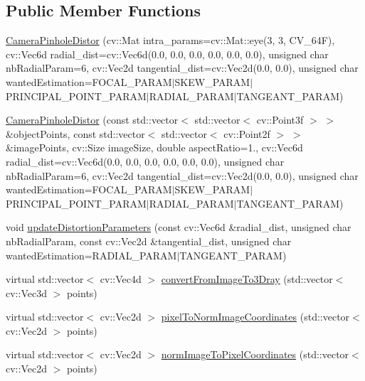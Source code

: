\subsection*{Public Member Functions}
\begin{DoxyCompactItemize}
\item 
\hyperlink{class_opencv_sf_m_1_1_camera_pinhole_distor_ad58c8fb16fdbb0eba4345cd3abe47a92}{CameraPinholeDistor} (cv::Mat intra\_\-params=cv::Mat::eye(3, 3, CV\_\-64F), cv::Vec6d radial\_\-dist=cv::Vec6d(0.0, 0.0, 0.0, 0.0, 0.0, 0.0), unsigned char nbRadialParam=6, cv::Vec2d tangential\_\-dist=cv::Vec2d(0.0, 0.0), unsigned char wantedEstimation=FOCAL\_\-PARAM$|$SKEW\_\-PARAM$|$PRINCIPAL\_\-POINT\_\-PARAM$|$RADIAL\_\-PARAM$|$TANGEANT\_\-PARAM)
\item 
\hyperlink{class_opencv_sf_m_1_1_camera_pinhole_distor_ab3f32742332ecaab124721e9b259f932}{CameraPinholeDistor} (const std::vector$<$ std::vector$<$ cv::Point3f $>$ $>$ \&objectPoints, const std::vector$<$ std::vector$<$ cv::Point2f $>$ $>$ \&imagePoints, cv::Size imageSize, double aspectRatio=1., cv::Vec6d radial\_\-dist=cv::Vec6d(0.0, 0.0, 0.0, 0.0, 0.0, 0.0), unsigned char nbRadialParam=6, cv::Vec2d tangential\_\-dist=cv::Vec2d(0.0, 0.0), unsigned char wantedEstimation=FOCAL\_\-PARAM$|$SKEW\_\-PARAM$|$PRINCIPAL\_\-POINT\_\-PARAM$|$RADIAL\_\-PARAM$|$TANGEANT\_\-PARAM)
\item 
void \hyperlink{class_opencv_sf_m_1_1_camera_pinhole_distor_aab95df60504b6bda45c11b53f939ad21}{updateDistortionParameters} (const cv::Vec6d \&radial\_\-dist, unsigned char nbRadialParam, const cv::Vec2d \&tangential\_\-dist, unsigned char wantedEstimation=RADIAL\_\-PARAM$|$TANGEANT\_\-PARAM)
\item 
virtual std::vector$<$ cv::Vec4d $>$ \hyperlink{class_opencv_sf_m_1_1_camera_pinhole_distor_a0fba2c497b42a751e77070885e964e7c}{convertFromImageTo3Dray} (std::vector$<$ cv::Vec3d $>$ points)
\item 
virtual std::vector$<$ cv::Vec2d $>$ \hyperlink{class_opencv_sf_m_1_1_camera_pinhole_distor_a506e945a43e874cc6235625c2a9cc064}{pixelToNormImageCoordinates} (std::vector$<$ cv::Vec2d $>$ points)
\item 
virtual std::vector$<$ cv::Vec2d $>$ \hyperlink{class_opencv_sf_m_1_1_camera_pinhole_distor_a9d93e59eeff696c413493377cc42bb3d}{normImageToPixelCoordinates} (std::vector$<$ cv::Vec2d $>$ points)
\end{DoxyCompactItemize}
